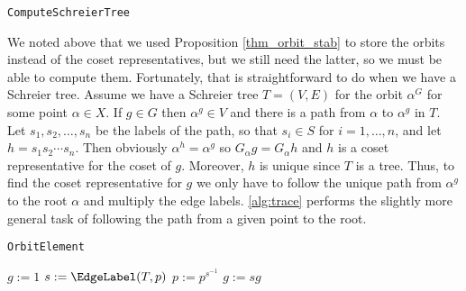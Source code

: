 \begin{algorithm} 
\dontprintsemicolon
\caption{\texttt{ComputeSchreierTree}}
\label{alg:orbit}
\end{algorithm}
We noted above that we used Proposition \ref{thm_orbit_stab} to store the orbits
instead of the coset representatives, but we still need the latter, so
we must be able to compute them. Fortunately, that is straightforward to do when we
have a Schreier tree.  Assume we have a Schreier tree $T =
(V, E)$ for the orbit $\alpha^G$ for some point $\alpha \in X$. If $g
\in G$ then $\alpha^g \in V$ and there is a path from $\alpha$ to
$\alpha^g$ in $T$. Let $s_1, s_2, \dotsc, s_n$ be the labels of the
path, so that $s_i \in S$ for $i = 1, \dotsc, n$, and let $h = s_1 s_2
\dotsm s_n$. Then obviously $\alpha^h = \alpha^g$ so $G_{\alpha} g = 
G_{\alpha} h$ and $h$ is a coset representative for the coset of $g$.
Moreover, $h$ is unique since $T$ is a tree. Thus, to find the coset
representative for $g$ we only have to follow the unique path from
$\alpha^g$ to the root $\alpha$ and multiply the edge labels. \ref{alg:trace} performs the slightly more general task of
following the path from a given point to the root.

\begin{algorithm} 
\dontprintsemicolon
\caption{\texttt{OrbitElement}}
\Begin
{
  $g := 1$ \;
  {
    $s := \EdgeLabel(T, p)$ \;
    $p := p^{s^{-1}}$ \;
    $g := s g$ \;
  }
}
\label{alg:trace}
\end{algorithm}

